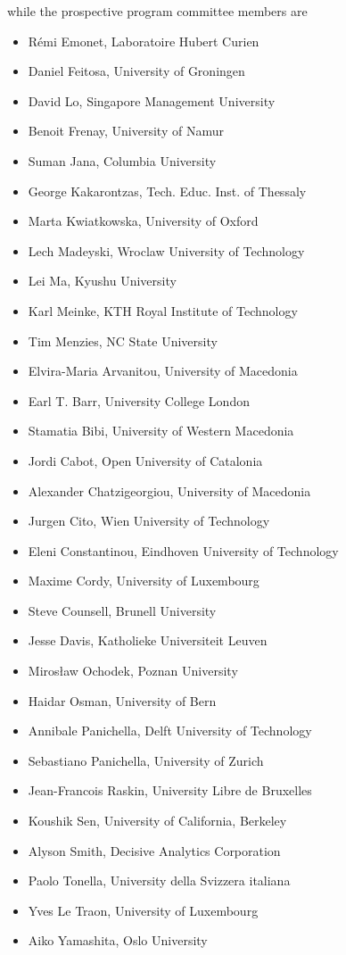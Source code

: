 	while the prospective program committee members are

\begin{itemize}[itemsep=0.5em]
	
	
	\item Rémi Emonet, Laboratoire Hubert Curien
	\item Daniel Feitosa, University of Groningen
    \item David Lo, Singapore Management University
	\item Benoit Frenay, University of Namur
	\item Suman Jana, Columbia University
    \item George Kakarontzas, Tech. Educ. Inst. of Thessaly
	\item Marta Kwiatkowska, University of Oxford
	\item Lech Madeyski, Wroclaw University of Technology
    \item Lei Ma, Kyushu University
	\item Karl Meinke, KTH Royal Institute of Technology
	\item Tim Menzies, NC State University
	\item Elvira-Maria Arvanitou, University of Macedonia
	\item Earl T. Barr, University College London
	\item Stamatia Bibi, University of Western Macedonia
	\item Jordi Cabot, Open University of Catalonia
	\item Alexander Chatzigeorgiou, University of Macedonia
	\item Jurgen Cito, Wien University of Technology
	\item Eleni Constantinou, Eindhoven University of Technology
	\item Maxime Cordy, University of Luxembourg
	\item Steve Counsell, Brunell University
	\item Jesse Davis, Katholieke Universiteit Leuven
	\item Mirosław Ochodek, Poznan University
	\item Haidar Osman, University of Bern
	\item Annibale Panichella, Delft University of Technology
	\item Sebastiano Panichella, University of Zurich
	\item Jean-Francois Raskin, University Libre de Bruxelles
	\item Koushik Sen, University of California, Berkeley
	\item Alyson Smith, Decisive Analytics Corporation
	\item Paolo Tonella, University della Svizzera italiana
	\item Yves Le Traon, University of Luxembourg
	\item Aiko Yamashita, Oslo University

\end{itemize}
